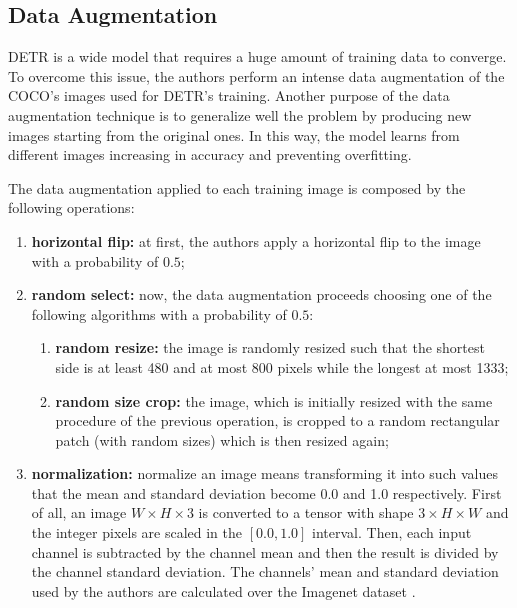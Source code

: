 \subsection{Data Augmentation} DETR \cite{detr} is a wide model that requires a huge amount of training data to converge. To overcome this issue, the authors perform an intense data augmentation of the COCO's images used for DETR's training. Another purpose of the data augmentation technique is to generalize well the problem by producing new images starting from the original ones. In this way, the model learns from different images increasing in accuracy and preventing overfitting. 

The data augmentation applied to each training image is composed by the following operations:

\begin{enumerate}
	\item \textbf{horizontal flip:} at first, the authors apply a horizontal flip to the image with a probability of $0.5$;
	\item \textbf{random select:} now, the data augmentation proceeds choosing one of the following algorithms with a probability of $0.5$:
	\begin{enumerate}
		\item \textbf{random resize:} the image is randomly resized such that the shortest side is at least 480 and at most 800 pixels while the longest at most 1333;
		\item \textbf{random size crop:} the image, which is initially resized with the same procedure of the previous operation, is cropped to a random rectangular patch (with random sizes) which is then resized again;
	\end{enumerate} 
	\item \textbf{normalization:} normalize an image means transforming it into such values that the mean and standard deviation become 0.0 and 1.0 respectively. First of all, an image $W \times H \times 3$ is converted to a tensor with shape $3 \times H \times W $ and the integer pixels are scaled in the $[0.0, 1.0]$ interval. Then, each input channel is subtracted by the channel mean and then the result is divided by the channel standard deviation. The channels' mean and standard deviation used by the authors are calculated over the Imagenet dataset \cite{imagenet}.
\end{enumerate}

